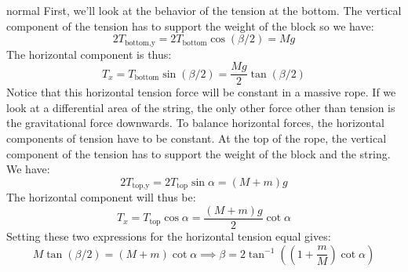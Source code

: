 \begin{solution}{normal}
First, we'll look at the behavior of the tension at the bottom. The vertical component of the tension has to support the weight of the block so we have:
$$2T_\text{bottom,y} = 2T_\text{bottom}\cos(\beta/2) = Mg$$The horizontal component is thus:
$$T_x=T_\text{bottom}\sin(\beta/2) = \frac{Mg}{2}\tan(\beta/2)$$Notice that this horizontal tension force will be constant in a massive rope. If we look at a differential area of the string, the only other force other than tension is the gravitational force downwards. To balance horizontal forces, the horizontal components of tension have to be constant. At the top of the rope, the vertical component of the tension has to support the weight of the block and the string. We have:
$$2T_\text{top,y} = 2T_\text{top}\sin\alpha = (M+m)g$$The horizontal component will thus be:
$$T_x = T_\text{top}\cos\alpha = \frac{(M+m)g}{2}\cot\alpha$$
Setting these two expressions for the horizontal tension equal gives:
$$M\tan(\beta/2)=(M+m)\cot\alpha \implies \boxed{\beta = 2 \tan^{-1}\left(\left(1+\frac{m}{M}\right)\cot \alpha\right)}$$
\end{solution}
